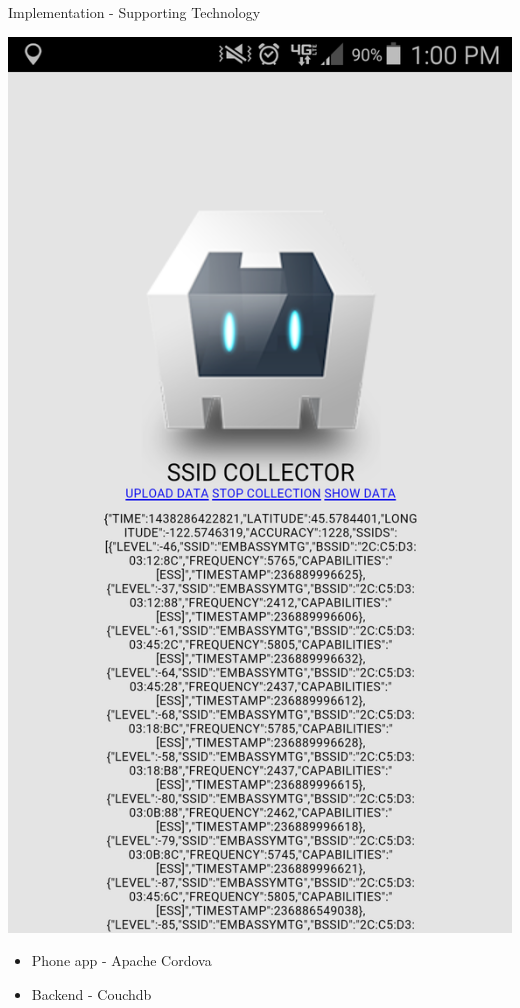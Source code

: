 \documentclass[11pt]{beamer}
\begin{document}
\begin{frame}{Implementation - Supporting Technology}


    \includegraphics[height=0.7\textheight]{pictures/phoneapp.png}
    \begin{itemize}
        \item Phone app - Apache Cordova
        \item Backend - Couchdb
    \end{itemize}

\end{frame}
\end{document}
